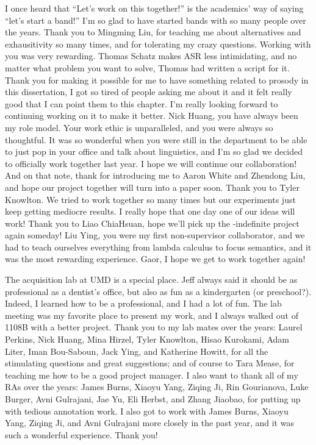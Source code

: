 I once heard that “Let’s work on this together!” is the academics’ way of saying “let’s start a band!” I’m so glad to have started bands with so many people over the years. Thank you to Mingming Liu, for teaching me about alternatives and exhausitivity so many times, and for tolerating my crazy questions. Working with you was very rewarding.  Thomas Schatz makes ASR less intimidating, and no matter what problem you want to solve, Thomas had written a script for it. Thank you for making it possible for me to have something related to prosody in this dissertation, I got so tired of people asking me about it and it felt really good that I can point them to this chapter. I’m really looking forward to continuing working on it to make it better. Nick Huang, you have always been my role model. Your work ethic is unparalleled, and you were always so thoughtful. It was so wonderful when you were still in the department to be able to just pop in your office and talk about linguistics, and I’m so glad we decided to officially work together last year. I hope we will continue our collaboration! And on that note, thank for introducing me to Aaron White and Zhendong Liu, and hope our project together will turn into a paper soon. Thank you to Tyler Knowlton. We tried to work together so many times but our experiments just keep getting mediocre results. I really hope that one day one of our ideas will work! Thank you to Liao ChiaHsuan, hope we’ll pick up the \twh-indefinite project again someday! Liu Ying, you were my first non-supervisor collaborator, and we had to teach ourselves everything from lambda calculus to focus semantics, and it was the most rewarding experience. Gaor, I hope we get to work together again!
 
The acquisition lab at UMD is a special place. Jeff always said it should be as professional as a dentist's office, but also as fun as a kindergarten (or preschool?). Indeed, I learned how to be a professional, and I had a lot of fun. The lab meeting was my favorite place to present my work, and I always walked out of 1108B with a better project. Thank you to my lab mates over the years: Laurel Perkins, Nick Huang, Mina Hirzel, Tyler Knowlton, Hisao Kurokami, Adam Liter, Iman Bou-Saboun, Jack Ying, and Katherine Howitt, for all the stimulating questions and great suggestions; and of course to Tara Mease, for teaching me how to be a good project manager. I also want to thank all of my RAs over the years: James Burns, Xiaoyu Yang, Ziqing Ji, Rin Gourianova, Luke Burger, Avni Gulrajani, Jae Yu, Eli Herbst, and Zhang Jiaobao, for putting up with tedious annotation work. I also got to work with James Burns, Xiaoyu Yang, Ziqing Ji, and Avni Gulrajani more closely in the past year, and it was such a wonderful experience. Thank you!
 
